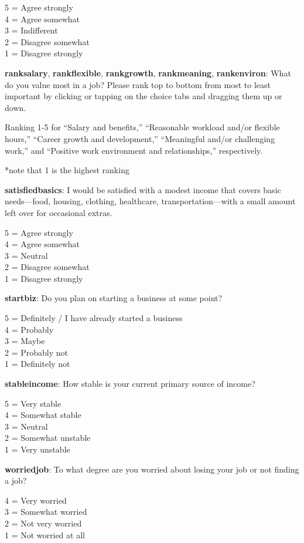 \documentclass[11pt, headsepline]{article}
\begin{document}
5 = Agree strongly \\
4 = Agree somewhat \\
3 = Indifferent \\
2 = Disagree somewhat \\
1 = Disagree strongly

\textbf{ranksalary}, \textbf{rankflexible}, \textbf{rankgrowth}, \textbf{rankmeaning}, \textbf{rankenviron}: What do you value most in a job? Please rank top to bottom from most to least important by clicking or tapping on the choice tabs and dragging them up or down.

Ranking 1-5 for ``Salary and benefits,'' ``Reasonable workload and/or flexible hours,'' ``Career growth and development,'' ``Meaningful and/or challenging work,'' and ``Positive work environment and relationships,'' respectively.

*note that 1 is the highest ranking

\textbf{satisfiedbasics}: I would be satisfied with a modest income that covers basic needs—food, housing, clothing, healthcare, transportation—with a small amount left over for occasional extras.

5 = Agree strongly \\
4 = Agree somewhat \\
3 = Neutral \\
2 = Disagree somewhat \\
1 = Disagree strongly

\textbf{startbiz}: Do you plan on starting a business at some point?

5 = Definitely / I have already started a business \\
4 = Probably \\ 
3 = Maybe \\
2 = Probably not \\
1 = Definitely not

\textbf{stableincome}: How stable is your current primary source of income?

5 = Very stable \\
4 = Somewhat stable \\
3 = Neutral \\
2 = Somewhat unstable \\
1 = Very unstable

\textbf{worriedjob}: To what degree are you worried about losing your job or not finding a job?

4 = Very worried \\
3 = Somewhat worried \\
2 = Not very worried \\
1 = Not worried at all
\end{document}
